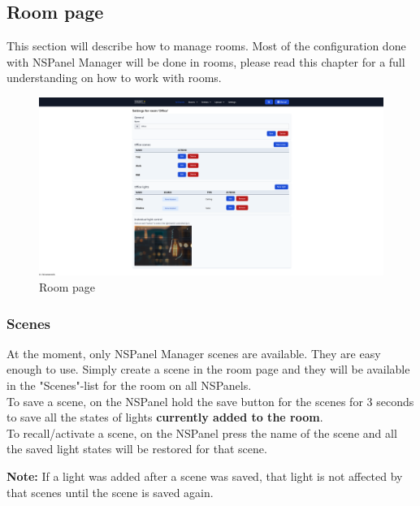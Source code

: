 \documentclass[10pt]{article}
\newcommand{\note}[1]{\begin{noteBox} \textbf{Note:} #1 \end{noteBox}}
\begin{document}
    \hypertarget{sec:room_page}{}
    \subsection{Room page}
    \label{sec:room_page}
    This section will describe how to manage rooms. Most of the configuration done with NSPanel Manager will be done in rooms, please read this chapter for a full understanding on how to work with rooms.

    \begin{figure}[H]
    \centering
    \includegraphics[width=\textwidth,height=\textheight,keepaspectratio]{room_page.png}
    \caption{Room page}%
    \end{figure}
    \subsubsection{Scenes}
    At the moment, only NSPanel Manager scenes are available. They are easy enough to use. Simply create a scene in the room page and they will be available in the "Scenes"-list for the room on all NSPanels.
    \\ To save a scene, on the NSPanel hold the save button for the scenes for 3 seconds to save all the states of lights \textbf{currently added to the room}.
    \\ To recall/activate a scene, on the NSPanel press the name of the scene and all the saved light states will be restored for that scene.
    \note{If a light was added after a scene was saved, that light is not affected by that scenes until the scene is saved again.}
\end{document}
